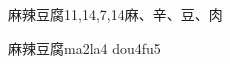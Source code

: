 \begin{entry}{麻辣豆腐}{11,14,7,14}{⿇、⾟、⾖、⾁}
  \begin{phonetics}{麻辣豆腐}{ma2la4 dou4fu5}
  \end{phonetics}
\end{entry}
